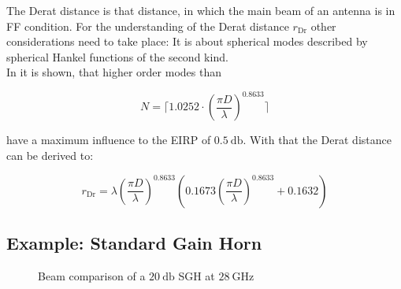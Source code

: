 The Derat distance is that distance, in which the main beam of an antenna is in \ac{FF} condition. For the understanding of the Derat distance $r_{\text{Dr}}$ other considerations need to take place: It is about spherical modes described by spherical Hankel functions  of the second kind. \cite{8393926} \cite{hansen}\\
In \cite{8393926} it is shown, that higher order modes than 

\begin{equation}
N = \lceil 1.0252\cdot\left(\frac{\pi D}{\lambda}\right)^{0.8633} \rceil
\end{equation}

have a maximum influence to the \ac{EIRP} of $\SI{0.5}{\decibel}$. With that the Derat distance can be derived to:

\begin{equation}
r_{\text{Dr}} = \lambda\left(\frac{\pi D}{\lambda}\right)^{0.8633}\left(0.1673\left(\frac{\pi D}{\lambda}\right)^{0.8633}+0.1632\right)
\end{equation}

\subsection{Example: Standard Gain Horn}

\begin{figure}[H]
\centering
  \centering
  \centering
  \centering
\caption{Beam comparison of a $\SI{20}{\decibel}$ \ac{SGH} at $\SI{28}{\giga\hertz}$}
\label{fig:beamcpmp}
\end{figure}

